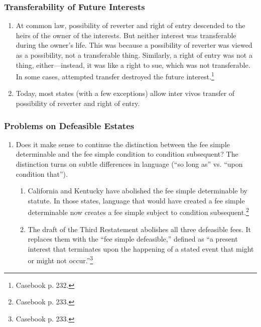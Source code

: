 \subsubsection{Transferability of Future Interests}

\begin{enumerate}
    \item At common law, possibility of reverter and right of entry descended 
    to the heirs of the owner of the interests. But neither interest was 
    transferable during the owner's life. This was because a possibility of 
    reverter was viewed as a possibility, not a transferable thing. Similarly, 
    a right of entry was not a thing, either---instead, it was like a right to 
    sue, which was not transferable. In some cases, attempted transfer 
    destroyed the future interest.\footnote{Casebook p. 232.}
    \item Today, most states (with a few exceptions) allow inter vivos 
    transfer of possibility of reverter and right of entry.
\end{enumerate}

\subsubsection{Problems on Defeasible Estates}

\begin{enumerate}
    \item Does it make sense to continue the distinction between the fee 
    simple determinable and the fee simple condition to condition subsequent? 
    The distinction turns on subtle differences in language (``so long as'' 
    vs. ``upon condition that'').
    \begin{enumerate}
        \item California and Kentucky have abolished the fee simple 
        determinable by statute. In those states, language that would have 
        created a fee simple determinable now creates a fee simple subject to 
        condition subsequent.\footnote{Casebook p. 233.}
        \item The draft of the Third Restatement abolishes all three 
        defeasible fees. It replaces them with the ``fee simple defeasible,'' 
        defined as ``a present interest that terminates upon the happening of 
        a stated event that might or might not occur.''\footnote{Casebook p. 
        233.}
    \end{enumerate}
\end{enumerate}

